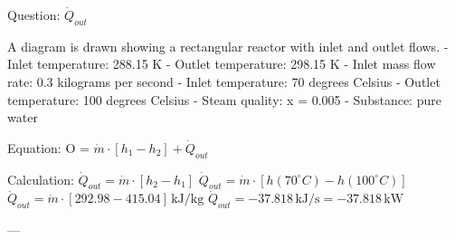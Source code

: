 Question: \( \dot{Q}_{out} \)  

A diagram is drawn showing a rectangular reactor with inlet and outlet flows.  
- Inlet temperature: 288.15 K  
- Outlet temperature: 298.15 K  
- Inlet mass flow rate: 0.3 kilograms per second  
- Inlet temperature: 70 degrees Celsius  
- Outlet temperature: 100 degrees Celsius  
- Steam quality: x = 0.005  
- Substance: pure water  

Equation:  
O = \( \dot{m} \cdot [h_1 - h_2] + \dot{Q}_{out} \)  

Calculation:  
\( \dot{Q}_{out} = \dot{m} \cdot [h_2 - h_1] \)  
\( \dot{Q}_{out} = \dot{m} \cdot [h(70^\circ C) - h(100^\circ C)] \)  
\( \dot{Q}_{out} = \dot{m} \cdot [292.98 - 415.04] \, \text{kJ/kg} \)  
\( \dot{Q}_{out} = -37.818 \, \text{kJ/s} = -37.818 \, \text{kW} \)  

---